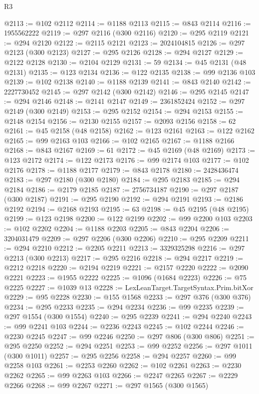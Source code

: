 \begin{lexlean}{R3}
\begin{coremodule}
@2113 := @102 @2112
@2114 := @1188 @2113
@2115 := @843 @2114
@2116 := 1955562222
@2119 := @297 @2116 (@300 @2116)
@2120 := @295 @2119
@2121 := @294 @2120
@2122 := @2115 @2121
@2123 := 2024104815
@2126 := @297 @2123 (@300 @2123)
@2127 := @295 @2126
@2128 := @294 @2127
@2129 := @2122 @2128
@2130 := @2104 @2129
@2131 := 59
@2134 := @45 @2131 (@48 @2131)
@2135 := @123 @2134
@2136 := @122 @2135
@2138 := @99 @2136 @103
@2139 := @102 @2138
@2140 := @1188 @2139
@2141 := @843 @2140
@2142 := 2227730452
@2145 := @297 @2142 (@300 @2142)
@2146 := @295 @2145
@2147 := @294 @2146
@2148 := @2141 @2147
@2149 := 2361852424
@2152 := @297 @2149 (@300 @2149)
@2153 := @295 @2152
@2154 := @294 @2153
@2155 := @2148 @2154
@2156 := @2130 @2155
@2157 := @2093 @2156
@2158 := 62
@2161 := @45 @2158 (@48 @2158)
@2162 := @123 @2161
@2163 := @122 @2162
@2165 := @99 @2163 @103
@2166 := @102 @2165
@2167 := @1188 @2166
@2168 := @843 @2167
@2169 := 61
@2172 := @45 @2169 (@48 @2169)
@2173 := @123 @2172
@2174 := @122 @2173
@2176 := @99 @2174 @103
@2177 := @102 @2176
@2178 := @1188 @2177
@2179 := @843 @2178
@2180 := 2428436474
@2183 := @297 @2180 (@300 @2180)
@2184 := @295 @2183
@2185 := @294 @2184
@2186 := @2179 @2185
@2187 := 2756734187
@2190 := @297 @2187 (@300 @2187)
@2191 := @295 @2190
@2192 := @294 @2191
@2193 := @2186 @2192
@2194 := @2168 @2193
@2195 := 63
@2198 := @45 @2195 (@48 @2195)
@2199 := @123 @2198
@2200 := @122 @2199
@2202 := @99 @2200 @103
@2203 := @102 @2202
@2204 := @1188 @2203
@2205 := @843 @2204
@2206 := 3204031479
@2209 := @297 @2206 (@300 @2206)
@2210 := @295 @2209
@2211 := @294 @2210
@2212 := @2205 @2211
@2213 := 3329325298
@2216 := @297 @2213 (@300 @2213)
@2217 := @295 @2216
@2218 := @294 @2217
@2219 := @2212 @2218
@2220 := @2194 @2219
@2221 := @2157 @2220
@2222 := @2090 @2221
@2223 := @1955 @2222
@2225 := @1096 (@1684 @2223)
@2226 := @75 @2225
@2227 := @1039 @13
@2228 := LexLeanTarget.TargetSyntax.Prim.bitXor
@2229 := @95 @2228
@2230 := @155 @1568
@2233 := @297 @376 (@300 @376)
@2234 := @295 @2233
@2235 := @294 @2234
@2236 := @99 @2235
@2239 := @297 @1554 (@300 @1554)
@2240 := @295 @2239
@2241 := @294 @2240
@2243 := @99 @2241 @103
@2244 := @2236 @2243
@2245 := @102 @2244
@2246 := @2230 @2245
@2247 := @99 @2246
@2250 := @297 @806 (@300 @806)
@2251 := @295 @2250
@2252 := @294 @2251
@2253 := @99 @2252
@2256 := @297 @1011 (@300 @1011)
@2257 := @295 @2256
@2258 := @294 @2257
@2260 := @99 @2258 @103
@2261 := @2253 @2260
@2262 := @102 @2261
@2263 := @2230 @2262
@2265 := @99 @2263 @103
@2266 := @2247 @2265
@2267 := @2229 @2266
@2268 := @99 @2267
@2271 := @297 @1565 (@300 @1565)

\end{coremodule}
\end{lexlean}
